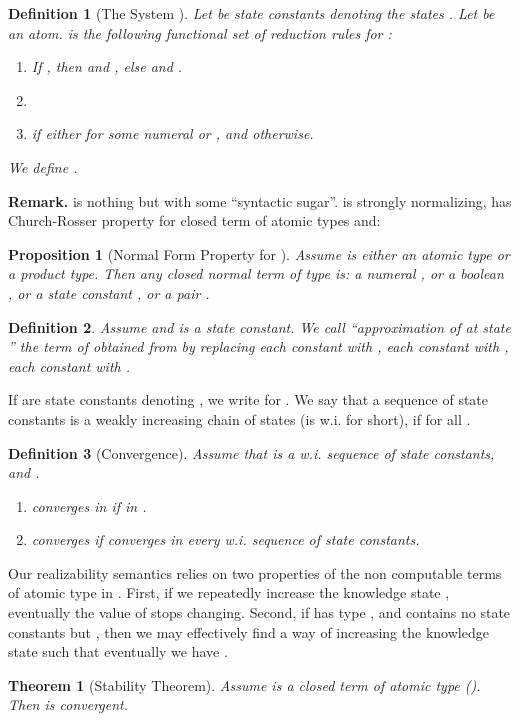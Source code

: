 \documentclass[copyright,creativecommons]{eptcs}
\newtheorem{theorem}{Theorem}
\newtheorem{proposition}{Proposition}
\newtheorem{definition}{Definition}
\begin{document}
\begin{definition}[The System ] \label{definition-EquationalTheoryL1}
Let   be state constants denoting the states . Let  be an atom.  is the following functional set of reduction rules for :
\begin{enumerate}
\item
If , then
 and , else
 and .

\item

\item
 if either  for some numeral  or , and  otherwise.

\end{enumerate}

We define .
\end{definition}
\textbf{Remark.}  is nothing but  with some ``syntactic sugar''.   is strongly normalizing, has Church-Rosser property for closed term of atomic types and:


\begin{proposition}[Normal Form Property for ]\label{proposition-normalform} Assume  is either an atomic type or a product type. Then any closed normal term  of type  is: a numeral , or a boolean , or a state constant , or a pair .
\end{proposition}



\begin{definition} Assume  and   is a state constant. We call ``approximation of  at state '' the term  of  obtained from  by replacing each constant  with , each constant  with , each constant  with .
\end{definition}




 If  are state constants denoting , we write  for . We say that a sequence  of state constants is a weakly increasing chain of states (is w.i. for short), if  for all .

\begin{definition}[Convergence]
\label{definition-Convergence} Assume
that  is a w.i. sequence of state constants,
and .
\begin{enumerate}

\item
   converges in  if  in .

\item
 converges if  converges in every w.i. sequence of state constants.
\end{enumerate}
\end{definition}
Our realizability semantics relies on two properties of the non computable terms of atomic type in . First, if we repeatedly increase the knowledge state , eventually the value of  stops changing. Second, if  has type , and contains no state constants but , then we may effectively find a way of increasing the knowledge state  such that eventually we have . 
\begin{theorem}[Stability Theorem] \label{theorem-StabilityTheorem}
Assume  is a closed term of atomic type  (). Then  is convergent.
\end{theorem}
\end{document}
